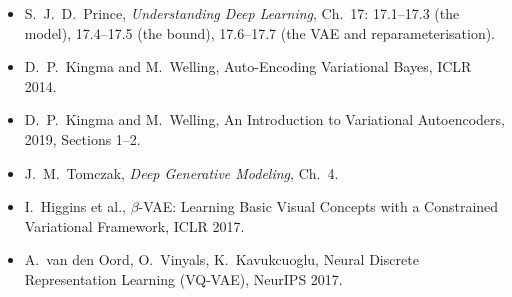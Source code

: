 \begin{itemize}[leftmargin=1.5em]
\item S.\ J.\ D.\ Prince, \emph{Understanding Deep Learning}, Ch.~17: 17.1--17.3 (the model), 17.4--17.5 (the bound), 17.6--17.7 (the VAE and reparameterisation).
\item D.\ P.\ Kingma and M.\ Welling, Auto-Encoding Variational Bayes, ICLR 2014.
\item D.\ P.\ Kingma and M.\ Welling, An Introduction to Variational Autoencoders, 2019, Sections 1--2.
\item J.\ M.\ Tomczak, \emph{Deep Generative Modeling}, Ch.~4.
\item I.\ Higgins et al., $\beta$-VAE: Learning Basic Visual Concepts with a Constrained Variational Framework, ICLR 2017.
\item A.\ van den Oord, O.\ Vinyals, K.\ Kavukcuoglu, Neural Discrete Representation Learning (VQ-VAE), NeurIPS 2017.
\end{itemize}
